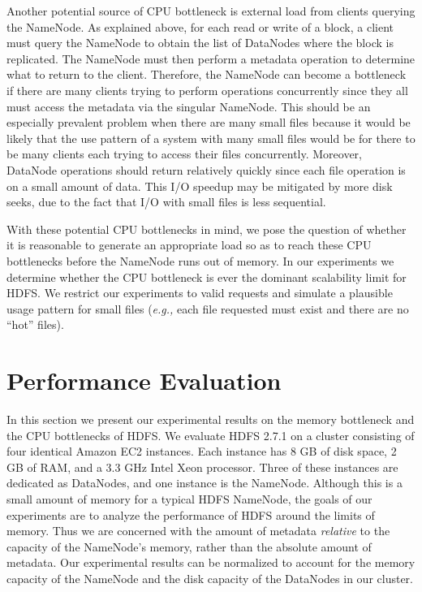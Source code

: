 \documentclass[11pt, a4paper]{article}
\begin{document}
\begin{multicols*}{2}
Another potential source of CPU bottleneck is external load from clients querying the NameNode. As explained above, for each read or write of a block, a client must query the NameNode to obtain the list of DataNodes where the block is replicated. The NameNode must then perform a metadata operation to determine what to return to the client. Therefore, the NameNode can become a bottleneck if there are many clients trying to perform operations concurrently since they all must access the metadata via the singular NameNode. This should be an especially prevalent problem when there are many small files because it would be likely that the use pattern of a system with many small files would be for there to be many clients each trying to access their files concurrently. Moreover, DataNode operations should return relatively quickly since each file operation is on a small amount of data. This I/O speedup may be mitigated by more disk seeks, due to the fact that I/O with small files is less sequential.

With these potential CPU bottlenecks in mind, we pose the question of whether it is reasonable to generate an appropriate load so as to reach these CPU bottlenecks before the NameNode runs out of memory. In our experiments we determine whether the CPU bottleneck is ever the dominant scalability limit for HDFS. We restrict our experiments to valid requests and simulate a plausible usage pattern for small files (\textit{e.g.,} each file requested must exist and there are no ``hot'' files).

\section{Performance Evaluation}

In this section we present our experimental results on the memory bottleneck and the CPU bottlenecks of HDFS. We evaluate HDFS 2.7.1 on a cluster consisting of four identical Amazon EC2 instances. Each instance has 8 GB of disk space, 2 GB of RAM, and a 3.3 GHz Intel Xeon processor. Three of these instances are dedicated as DataNodes, and one instance is the NameNode. Although this is a small amount of memory for a typical HDFS NameNode, the goals of our experiments are to analyze the performance of HDFS around the limits of memory. Thus we are concerned with the amount of metadata \textit{relative} to the capacity of the NameNode's memory, rather than the absolute amount of metadata. Our experimental results can be normalized to account for the memory capacity of the NameNode and the disk capacity of the DataNodes in our cluster.


\end{multicols*}
\end{document}
